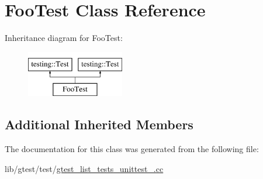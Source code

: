 \hypertarget{class_foo_test}{\section{Foo\-Test Class Reference}
\label{class_foo_test}
}
Inheritance diagram for Foo\-Test\-:\begin{figure}[H]
\begin{center}
\leavevmode
\includegraphics[height=2.000000cm]{class_foo_test}
\end{center}
\end{figure}
\subsection*{Additional Inherited Members}


The documentation for this class was generated from the following file\-:\begin{DoxyCompactItemize}
\item 
lib/gtest/test/\hyperlink{gtest__list__tests__unittest___8cc}{gtest\-\_\-list\-\_\-tests\-\_\-unittest\-\_\-.\-cc}\end{DoxyCompactItemize}

